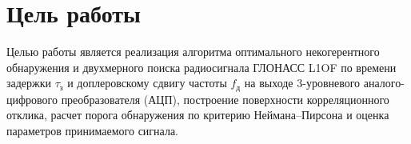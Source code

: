\section{Цель работы}
Целью работы является реализация алгоритма оптимального некогерентного обнаружения и двухмерного поиска радиосигнала ГЛОНАСС L1OF по времени задержки $\tau_{з}$ и доплеровскому сдвигу частоты $f_{д}$ на выходе 3-уровневого аналого-цифрового преобразователя (АЦП), построение поверхности корреляционного отклика, расчет порога обнаружения по критерию Неймана--Пирсона и оценка параметров принимаемого сигнала.
